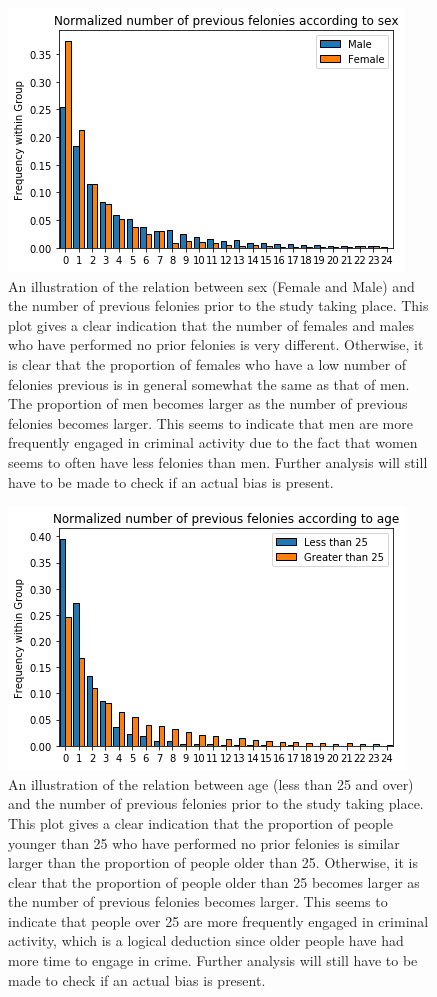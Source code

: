 \documentclass[11pt, fleqn, titlepage]{article}
\begin{document}
	\begin{figure}[H]
		\centering
		\includegraphics[width=0.5\linewidth]{imgs/proirs_sex}
		\caption{An illustration of the relation between sex (Female and Male) and the number of previous felonies prior to the study taking place. This plot gives a clear indication that the number of females and males who have performed no prior felonies is very different. Otherwise, it is clear that the proportion of females who have a low number of felonies previous is in general somewhat the same as that of men. The proportion of men becomes larger as the number of previous felonies becomes larger. This seems to indicate that men are more frequently engaged in criminal activity due to the fact that women seems to often have less felonies than men. Further analysis will still have to be made to check if an actual bias is present.}
		\label{fig:proirssex}
	\end{figure}
	
	\begin{figure}[H]
		\centering
		\includegraphics[width=0.5\linewidth]{imgs/proirs_age}
		\caption{An illustration of the relation between age (less than 25 and over) and the number of previous felonies prior to the study taking place. This plot gives a clear indication that the proportion of people younger than 25 who have performed no prior felonies is similar larger than the proportion of people older than 25. Otherwise, it is clear that the proportion of people older than 25 becomes larger as the number of previous felonies becomes larger. This seems to indicate that people over 25 are more frequently engaged in criminal activity, which is a logical deduction since older people have had more time to engage in crime. Further analysis will still have to be made to check if an actual bias is present.}
		\label{fig:proirsage}
	\end{figure}
	
\end{document}
